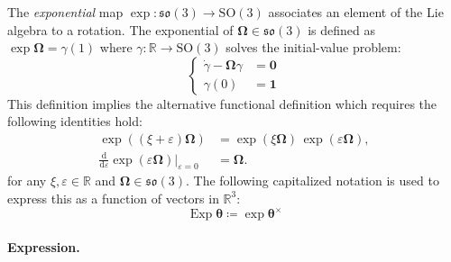 The \emph{exponential} map
\(\exp\colon \mathfrak{so}(3) \rightarrow \mathrm{SO}(3)\) associates an
element of the Lie algebra to a rotation. 
The exponential of \(\bm{\Omega} \in \mathfrak{so}(3)\) is defined as
\(\exp \bm{\Omega} =\gamma(1)\) where %
\(
\gamma: \mathbb{R} \rightarrow \mathrm{SO}(3)
\)
solves the initial-value problem:
\[
  \left\{
  \begin{aligned}
    \dot{\gamma} - \bm{\Omega}\gamma &= \bm{0} \\
    \gamma(0) &= \mathbf{1}
  \end{aligned}
  \right.
\]
This definition implies the alternative functional
definition which requires the following identities hold:
%
\begin{equation*} 
\begin{aligned}
\exp((\xi+\varepsilon) \bm{\Omega}) & = \exp(\xi \bm{\Omega}) \, \exp(\varepsilon \bm{\Omega}), \\
\frac{\mathrm{d}}{\mathrm{d}\varepsilon} 
\left.\operatorname{exp}(\varepsilon \bm{\Omega})\right.\biggr|_{\varepsilon=0} & =\bm{\Omega} .
\end{aligned}
\end{equation*}
  for any \(\xi, \varepsilon \in \mathbb{R}\) and
\(\bm{\Omega} \in \mathfrak{so}(3)\).
The following capitalized notation
is used to express this as a function of vectors in
\(\mathbb{R}^3\):
%
\begin{equation*} 
  \operatorname{Exp} \bm{\theta} \coloneq \exp \bm{\theta}^{\times}
\end{equation*}
 

\paragraph*{Expression.}

